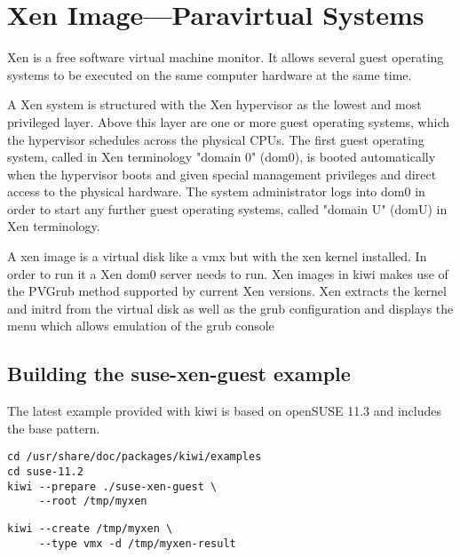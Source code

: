 \chapter{Xen Image---Paravirtual Systems}
\label{chapter:xen}
\minitoc

Xen is a free software virtual machine monitor. It allows several
guest operating systems to be executed on the same computer hardware
at the same time.

A Xen system is structured with the Xen hypervisor as the lowest and
most privileged layer.%
Above this layer are one or more guest
operating systems, which the hypervisor schedules across the physical
CPUs. The first guest operating system, called in Xen terminology
"domain 0" (dom0), is booted automatically when the hypervisor boots
and given special management privileges and direct access to the physical
hardware. The system administrator logs into dom0 in order to start
any further guest operating systems, called "domain U" (domU) in
Xen terminology.

A xen image is a virtual disk like a vmx but with the xen kernel
installed. In order to run it a Xen dom0 server needs to run. Xen
images in kiwi makes use of the PVGrub method supported by current
Xen versions. Xen extracts the kernel and initrd from the virtual
disk as well as the grub configuration and displays the menu which
allows emulation of the grub console

\section{Building the suse-xen-guest example}

The latest example provided with kiwi is based on openSUSE 11.3 and includes
the base pattern. 

\begin{Command}{12cm}
\begin{verbatim}
cd /usr/share/doc/packages/kiwi/examples
cd suse-11.2
kiwi --prepare ./suse-xen-guest \
     --root /tmp/myxen
\end{verbatim}
\end{Command}

\begin{Command}{12cm}
\begin{verbatim}
kiwi --create /tmp/myxen \
     --type vmx -d /tmp/myxen-result
\end{verbatim}
\end{Command}

